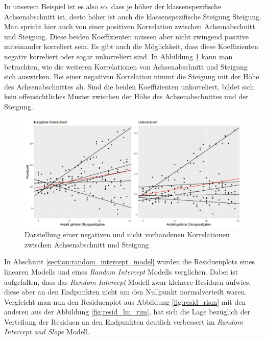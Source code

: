 \documentclass[12pt]{article}\usepackage[]{graphicx}\usepackage[]{color}
\numberwithin{equation}{section}
\begin{document}
In unserem Beispiel ist es also so, dass je höher der klassenspezifische Achsenabschnitt ist, desto höher ist auch die klassenspezifische Steigung Steigung. Man spricht hier auch von einer positiven Korrelation zwischen Achsenabschnitt und Steigung. Diese beiden Koeffizienten müssen aber nicht zwingend positive miteinander korreliert sein. Es gibt auch die Möglichkeit, dass diese Koeffizienten negativ korreliert oder sogar unkorreliert sind. In Abbildung \ref{fig:corr_s_i} kann man betrachten, wie die weiteren Korrelationen von Achsenabschnitt und Steigung sich auswirken. Bei einer negativen Korrelation nimmt die Steigung mit der Höhe des Achsenabschnittes ab. Sind die beiden Koeffizienten unkorreliert, bildet sich kein offensichtliches Muster zwischen der Höhe des Achsenabschnittes und der Steigung.

\begin{figure}[ht!]
\centering
\includegraphics[width = \textwidth]{corr_s_i}
\caption{Darstellung einer negativen und nicht vorhandenen Korrelationen zwischen Achsenabschnitt und Steigung}
\label{fig:corr_s_i}
\end{figure}

In Abschnitt \ref{section:random_intercept_model} wurden die Residuenplots eines linearen Modells und eines \textit{Random Intercept} Modells verglichen. Dabei ist aufgefallen, dass das \textit{Random Intercept} Modell zwar kleinere Residuen aufwies, diese aber an den Endpunkten nicht um den Nullpunkt normalverteilt waren. Vergleicht man nun den Residuenplot aus Abbildung \ref{fig:resid_rism} mit den anderen aus der Abbildung \ref{fig:resid_lm_rim}, hat sich die Lage bezüglich der Verteilung der Residuen an den Endpunkten deutlich verbessert im \textit{Random Intercept and Slope} Modell.
 
\end{document}
